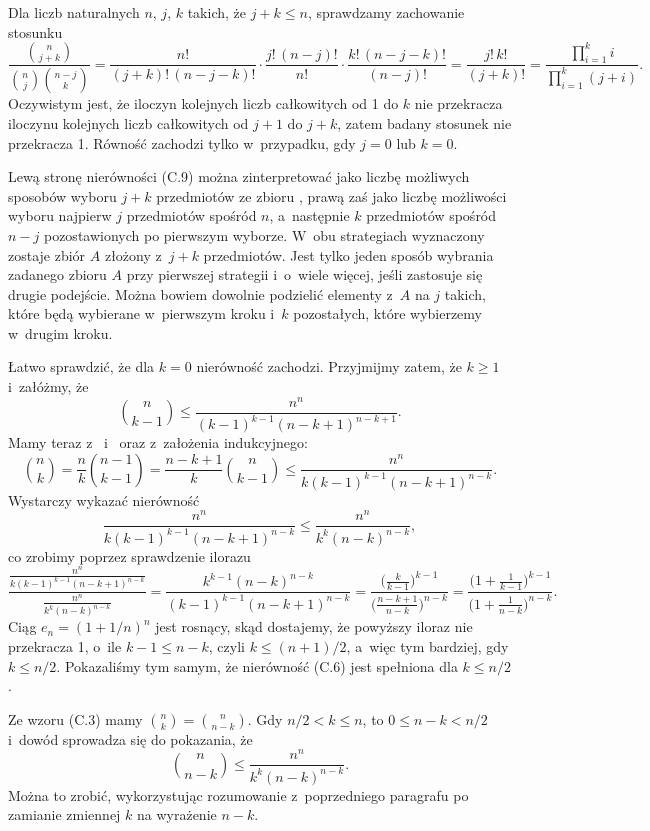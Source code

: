 \exercise %
Dla liczb naturalnych $n$, $j$, $k$ takich, że $j+k\le n$, sprawdzamy zachowanie stosunku
\[
	\frac{\binom{n}{j+k}}{\binom{n}{j}\binom{n-j}{k}} = \frac{n!}{(j+k)!\,(n-j-k)!}\cdot\frac{j!\,(n-j)!}{n!}\cdot\frac{k!\,(n-j-k)!}{(n-j)!} = \frac{j!\,k!}{(j+k)!} = \frac{\prod_{i=1}^ki}{\prod_{i=1}^k(j+i)}.
\]
Oczywistym jest, że iloczyn kolejnych liczb całkowitych od 1 do $k$ nie przekracza iloczynu kolejnych liczb całkowitych od $j+1$ do $j+k$, zatem badany stosunek nie przekracza 1.
Równość zachodzi tylko w~przypadku, gdy $j=0$ lub $k=0$.

Lewą stronę nierówności (C.9) można zinterpretować jako liczbę możliwych sposobów wyboru $j+k$ przedmiotów ze zbioru , prawą zaś jako liczbę możliwości wyboru najpierw $j$ przedmiotów spośród $n$, a~następnie $k$ przedmiotów spośród $n-j$ pozostawionych po pierwszym wyborze.
W~obu strategiach wyznaczony zostaje zbiór $A$ złożony z~$j+k$ przedmiotów.
Jest tylko jeden sposób wybrania zadanego zbioru $A$ przy pierwszej strategii i~o~wiele więcej, jeśli zastosuje się drugie podejście.
Można bowiem dowolnie podzielić elementy z~$A$ na $j$ takich, które będą wybierane w~pierwszym kroku i~$k$ pozostałych, które wybierzemy w~drugim kroku.

\exercise %
Łatwo sprawdzić, że dla $k=0$ nierówność zachodzi.
Przyjmijmy zatem, że $k\ge1$ i~załóżmy, że
\[
	\binom{n}{k-1} \le \frac{n^n}{(k-1)^{k-1}(n-k+1)^{n-k+1}}.
\]
Mamy teraz z~ i~ oraz z~założenia indukcyjnego:
\[
	\binom{n}{k} = \frac{n}{k}\binom{n-1}{k-1} = \frac{n-k+1}{k}\binom{n}{k-1} \le \frac{n^n}{k(k-1)^{k-1}(n-k+1)^{n-k}}.
\]
Wystarczy wykazać nierówność
\[
	\frac{n^n}{k(k-1)^{k-1}(n-k+1)^{n-k}} \le \frac{n^n}{k^k(n-k)^{n-k}},
\]
co zrobimy poprzez sprawdzenie ilorazu
\[
	\frac{\frac{n^n}{k(k-1)^{k-1}(n-k+1)^{n-k}}}{\frac{n^n}{k^k(n-k)^{n-k}}} = \frac{k^{k-1}(n-k)^{n-k}}{(k-1)^{k-1}(n-k+1)^{n-k}} = \frac{\bigl(\frac{k}{k-1}\bigr)^{k-1}}{\bigl(\frac{n-k+1}{n-k}\bigr)^{n-k}} = \frac{\bigl(1+\frac{1}{k-1}\bigr)^{k-1}}{\bigl(1+\frac{1}{n-k}\bigr)^{n-k}}.
\]
Ciąg $e_n={(1+1/n)}^n$ jest rosnący, skąd dostajemy, że powyższy iloraz nie przekracza 1, o~ile $k-1\le n-k$, czyli $k\le(n+1)/2$, a~więc tym bardziej, gdy $k\le n/2$.
Pokazaliśmy tym samym, że nierówność (C.6) jest spełniona dla $k\le n/2$.

Ze wzoru (C.3) mamy $\binom{n}{k}=\binom{n}{n-k}$.
Gdy $n/2<k\le n$, to $0\le n-k<n/2$ i~dowód sprowadza się do pokazania, że
\[
	\binom{n}{n-k} \le \frac{n^n}{k^k(n-k)^{n-k}}.
\]
Można to zrobić, wykorzystując rozumowanie z~poprzedniego paragrafu po zamianie zmiennej $k$ na wyrażenie $n-k$.

